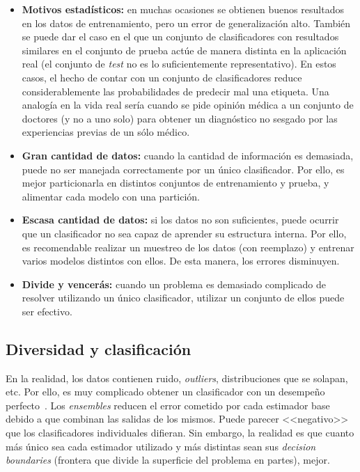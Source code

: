 \begin{itemize}
	\item \textbf{Motivos estadísticos:} en muchas ocasiones se obtienen buenos resultados en los datos de entrenamiento, pero un error de generalización alto. También se puede dar el caso en el que un conjunto de clasificadores con resultados similares en el conjunto de prueba actúe de manera distinta en la aplicación real (el conjunto de \textit{test} no es lo suficientemente representativo). En estos casos, el hecho de contar con un conjunto de clasificadores reduce considerablemente las probabilidades de predecir mal una etiqueta. Una analogía en la vida real sería cuando se pide opinión médica a un conjunto de doctores (y no a uno solo) para obtener un diagnóstico no sesgado por las experiencias previas de un sólo médico.
	
	\item \textbf{Gran cantidad de datos:} cuando la cantidad de información es demasiada, puede no ser manejada correctamente por un único clasificador. Por ello, es mejor particionarla en distintos conjuntos de entrenamiento y prueba, y alimentar cada modelo con una partición.
	
	\item \textbf{Escasa cantidad de datos:} si los datos no son suficientes, puede ocurrir que un clasificador no sea capaz de aprender su estructura interna. Por ello, es recomendable realizar un muestreo de los datos (con reemplazo) y entrenar varios modelos distintos con ellos. De esta manera, los errores disminuyen.
	
	\item \textbf{Divide y vencerás:} cuando un problema es demasiado complicado de resolver utilizando un único clasificador, utilizar un conjunto de ellos puede ser efectivo.
\end{itemize}


\subsection{Diversidad y clasificación}

En la realidad, los datos contienen ruido, \textit{outliers}, distribuciones que se solapan, etc. Por ello, es muy complicado obtener un clasificador con un desempeño perfecto~\cite{ensembles2006robi}. Los \textit{ensembles} reducen el error cometido por cada estimador base debido a que combinan las salidas de los mismos. Puede parecer <<negativo>> que los clasificadores individuales difieran. Sin embargo, la realidad es que cuanto más único sea cada estimador utilizado y más distintas sean sus \textit{decision boundaries} (frontera que divide la superficie del problema en partes), mejor.

